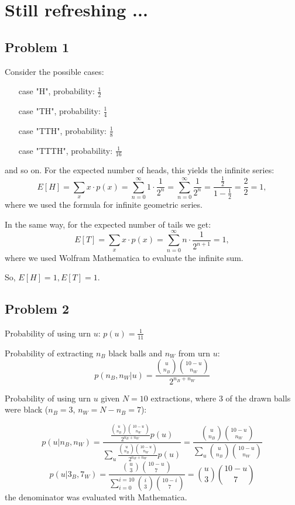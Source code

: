 
\section{Still refreshing ...}

\subsection*{Problem 1}

Consider the possible cases:
\begin{itemize}
  \item[case] "H", probability: $\frac{1}{2}$
  \item[case] "TH", probability: $\frac{1}{4}$
  \item[case] "TTH", probability: $\frac{1}{8}$
  \item[case] "TTTH", probability: $\frac{1}{16}$
\end{itemize}
and so on. For the expected number of heads, this yields the infinite series:
\begin{equation}
  E[H] = \sum_x x \cdot p(x) = \sum_{n=0}^\infty 1 \cdot \frac{1}{2^n} = 
         \sum_{n=0}^\infty \frac{1}{2^n} = \frac{\frac{1}{2}}{1 - \frac{1}{2}} = 
         \frac{2}{2} = 1,
\end{equation}
where we used the formula for infinite geometric series.

In the same way, for the expected number of tails we get:
\begin{equation}
  E[T] = \sum_x x \cdot p(x) = \sum_{n=0}^\infty n \cdot \frac{1}{2^{n+1}} = 1,
\end{equation}
where we used Wolfram Mathematica to evaluate the infinite sum.

So, $E[H] = 1, E[T] = 1$.





\subsection*{Problem 2}
Probability of using urn $u$: $p(u)=\frac{1}{11}$

Probability of extracting $n_{B}$ black balls and $n_{W}$ from urn
$u$: 
\[
p(n_{B},n_{W}|u)=\frac{\binom{u}{n_{B}}\binom{10-u}{n_{W}}}{2^{n_{B}+n_{W}}}
\]


Probability of using urn $u$ given $N=10$ extractions, where $3$
of the drawn balls were black ($n_{B}=3$, $n_{W}=N-n_{B}=7$):

\[
p(u|n_{B},n_{W})=\frac{\frac{\binom{u}{n_{B}}\binom{10-u}{n_{W}}}{2^{n_{B}+n_{W}}}p(u)}{\sum_{u}\frac{\binom{u}{n_{B}}\binom{10-u}{n_{W}}}{2^{n_{B}+n_{W}}}p(u)}=\frac{\binom{u}{n_{B}}\binom{10-u}{n_{W}}}{\sum_{u}\binom{u}{n_{B}}\binom{10-u}{n_{W}}}
\]
\[
p(u|3_{B},7_{W})=\frac{\binom{u}{3}\binom{10-u}{7}}{\sum_{i=0}^{i=10}\binom{i}{3}\binom{10-i}{7}}=\binom{u}{3}\binom{10-u}{7}
\]
 the denominator was evaluated with Mathematica.
